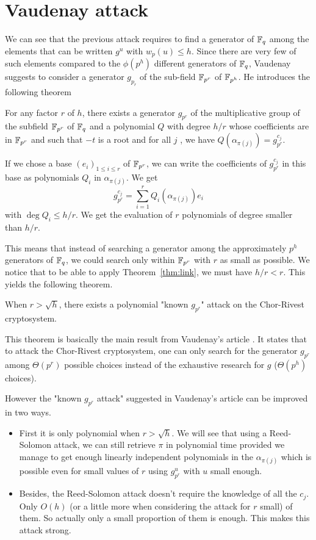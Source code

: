 \documentclass[12pt,a4paper,titlepage]{article}
\newcommand{\GF}[1]{\F_{#1}}
\begin{document}
\newpage
\section{Vaudenay attack}
\label{sec:Vau}

We can see that the previous attack requires to find a generator of $\mathbb{F}_q$ among the elements that can be written $g^u$ with $w_p(u) \leq h$. Since there are very few of such elements compared to the $\phi(p^h)$ different generators of $\mathbb{F}_q$, Vaudenay suggests \cite{Vau01} to consider a generator $g_{p_r}$ of the sub-field $\mathbb{F}_{p^r}$ of $\mathbb{F}_{p^h}$. He introduces the following theorem
\begin{theorem}
For any factor $r$ of $h$, there exists a generator $g_{p^r}$ of the multiplicative group of the subfield $\mathbb{F}_{p^r}$ of $\mathbb{F}_q$ and a polynomial $Q$ with degree $h/r$ whose coefficients are in $\mathbb{F}_{p^r}$ and such that $-t$ is a root and for all $j$ , we have $Q(\alpha_{\pi(j)}) = g_{p^r}^{c_j}$.
\end{theorem}

If we chose a base $(e_i)_{1 \leq i \leq r}$ of $\GF{p^r}$, we can write the coefficients of $g_{p^r}^{c_j}$ in this base as polynomials $Q_i$ in $\alpha_{\pi(j)}$. We get
$$ g_{p^r}^{c_j} = \sum_{i=1}^r Q_i(\alpha_{\pi(j)}) e_i $$
with $\deg Q_i \leq h/r$. We get the evaluation of $r$ polynomials of degree smaller than $h/r$.

This means that instead of searching a generator among the approximately $p^h$ generators of $\mathbb{F}_q$, we could search only within $\mathbb{F}_{p^r}$ with $r$ as small as possible. We notice that to be able to apply Theorem~\ref{thm:link}, we must have $h/r < r$. This yields the following theorem.

\begin{theorem}
When $r > \sqrt{h}$, there exists a polynomial "known $g_{p^r}$" attack on the Chor-Rivest cryptosystem.
\end{theorem}

This theorem is basically the main result from Vaudenay's article \cite{Vau01}. It states that to attack the Chor-Rivest cryptosystem, one can only search for the generator $g_{p^r}$ among $\Theta\left(p^r\right)$ possible choices instead of the exhaustive research for $g$ ($\Theta\left(p^h\right)$ choices).

However the "known $g_{p^r}$ attack" suggested in Vaudenay's article can be improved in two ways.

\begin{itemize}
\item First it is only polynomial when $r > \sqrt{h}$. We will see that using a Reed-Solomon attack, we can still retrieve $\pi$ in polynomial time provided we manage to get enough linearly independent polynomials in the $\alpha_{\pi(j)}$ which is possible even for small values of $r$ using $g_{p^r}^u$ with $u$ small enough.
\item Besides, the Reed-Solomon attack doesn't require the knowledge of all the $c_j$. Only $O(h)$ (or a little more when considering the attack for $r$ small) of them. So actually only a small proportion of them is enough. This makes this attack strong.
\end{itemize}
\end{document}
